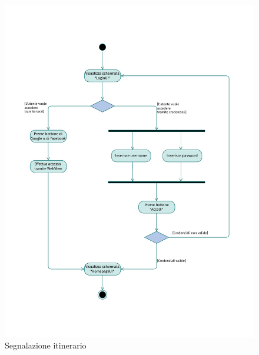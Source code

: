 \documentclass{natourDoc}
\begin{document}
	\newpage
	\begin{figure}[!htbp]
		\centering
		\includegraphics[width=\textwidth, page=13]{./diagrams/activity.pdf}
		\caption{Segnalazione itinerario}
	\end{figure}
	\FloatBarrier

	\newpage
\end{document}
